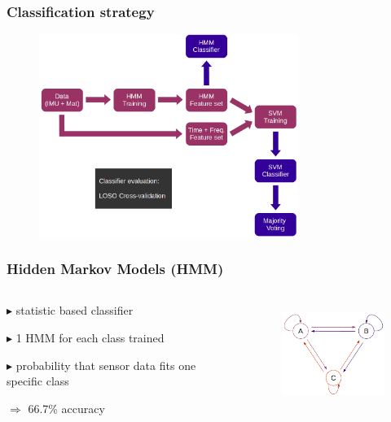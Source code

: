 \documentclass[aspectratio=43]{beamer} 	%
\begin{document}
\begin{frame}
\frametitle{Classification strategy}
\begin{figure}[!t]
\centering
\includegraphics[height=6.6cm]{classificationstrategy.png}
\end{figure}
\end{frame}










\begin{frame}
\frametitle{Hidden Markov Models (HMM)}

\begin{columns}
\begin{column}{6.5cm}
\begin{block}
{$\blacktriangleright$ statistic based classifier}
\end{block}
\begin{block}
{$\blacktriangleright$ 1 HMM for each class trained}
\end{block}
\begin{block}
{$\blacktriangleright$ probability that sensor data fits one specific class}
\end{block}

\begin{block}
{\newline $\Rightarrow$ 66.7\% accuracy}
\end{block}

\end{column}

\begin{column}{3.6cm}
\begin{figure}[!t]
\centering
\includegraphics[height=3.3cm]{HMM.png}
\end{figure}
\begin{block}
{}
\end{block}
\end{column}
\end{columns}

\end{frame}
\end{document}
